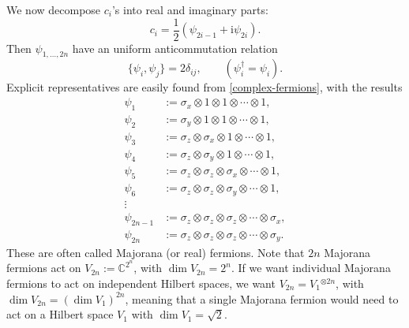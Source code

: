 \documentclass[12pt]{article}
\numberwithin{equation}{section}
\numberwithin{figure}{section}
\theoremstyle{remark}
\def\bC{\mathbb{C}}
\begin{document}
We now decompose $c_i$'s into real and imaginary parts: \begin{equation}
c_i = \frac12(\psi_{2i-1} + \mathrm{i} \psi_{2i}).
\end{equation}
Then $\psi_{1,\ldots,2n}$ have an uniform anticommutation relation \begin{equation}
\{\psi_i,\psi_j\}=2\delta_{ij}, \qquad (\psi_i^\dagger = \psi_i).
\label{maj-ac}
\end{equation} 
Explicit representatives are easily found from \eqref{complex-fermions},
with the results \begin{equation}
\begin{aligned}
\psi_1 &:= \sigma_x \otimes 1 \otimes 1\otimes \cdots \otimes 1 ,\\
\psi_2 &:= \sigma_y \otimes 1 \otimes 1\otimes \cdots \otimes 1 ,\\
\psi_3 &:= \sigma_z \otimes \sigma_x \otimes 1\otimes \cdots \otimes 1 ,\\
\psi_4 &:= \sigma_z \otimes \sigma_y \otimes 1\otimes \cdots \otimes 1 ,\\
\psi_5 &:= \sigma_z \otimes \sigma_z \otimes \sigma_x \otimes \cdots \otimes 1 ,\\
\psi_6 &:= \sigma_z \otimes \sigma_z \otimes \sigma_y \otimes \cdots \otimes 1 ,\\
\vdots\\
\psi_{2n-1} &:= \sigma_z \otimes\sigma_z \otimes \sigma_z \otimes\cdots\otimes \sigma_x,\\
\psi_{2n} &:= \sigma_z \otimes\sigma_z \otimes \sigma_z \otimes\cdots\otimes \sigma_y.
\end{aligned}
\end{equation}
These are often called Majorana (or real) fermions.
Note that $2n$ Majorana fermions act on $V_{2n}:=\bC^{2^n}$, with $\dim V_{2n}=2^n$.
If we want individual Majorana fermions to act on independent Hilbert spaces,
we want $V_{2n} = V_1{}^{\otimes 2n}$, with $\dim V_{2n}= (\dim V_1)^{2n}$,
meaning that a single Majorana fermion would need to act on 
a Hilbert space $V_1$ with $\dim V_1=\sqrt2$.
\end{document}
